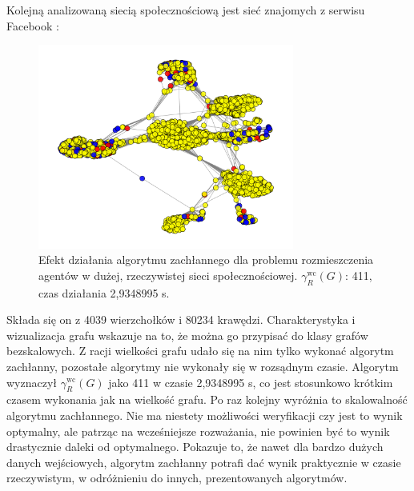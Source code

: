 Kolejną analizowaną siecią społecznościową jest sieć znajomych z serwisu Facebook \cite{FACEBOOK}:

\begin{figure}[H]
    \centering
    \includegraphics[width=0.75\textwidth]{assets/Facebook/facebookgreedy.png}
    \caption{Efekt działania algorytmu zachłannego dla problemu rozmieszczenia agentów w dużej, rzeczywistej sieci społecznościowej. $\gamma^{\text{wc}}_R(G)$: 411, czas działania 2,9348995 s.}
    \label{fig:fbgreedy}
\end{figure}

 Składa się on z 4039 wierzchołków i 80234 krawędzi. Charakterystyka i wizualizacja grafu wskazuje na to, że można go przypisać do klasy grafów bezskalowych. Z racji wielkości grafu udało się na nim tylko wykonać algorytm zachłanny, pozostałe algorytmy nie wykonały się w rozsądnym czasie. Algorytm wyznaczył $\gamma^{\text{wc}}_R(G)$ jako 411 w czasie 2,9348995 s, co jest stosunkowo krótkim czasem wykonania jak na wielkość grafu. Po raz kolejny wyróżnia to skalowalność algorytmu zachłannego. Nie ma niestety możliwości weryfikacji czy jest to wynik optymalny, ale patrząc na wcześniejsze rozważania, nie powinien być to wynik drastycznie daleki od optymalnego. Pokazuje to, że nawet dla bardzo dużych danych wejściowych, algorytm zachłanny potrafi dać wynik praktycznie w czasie rzeczywistym, w odróżnieniu do innych, prezentowanych algorytmów.